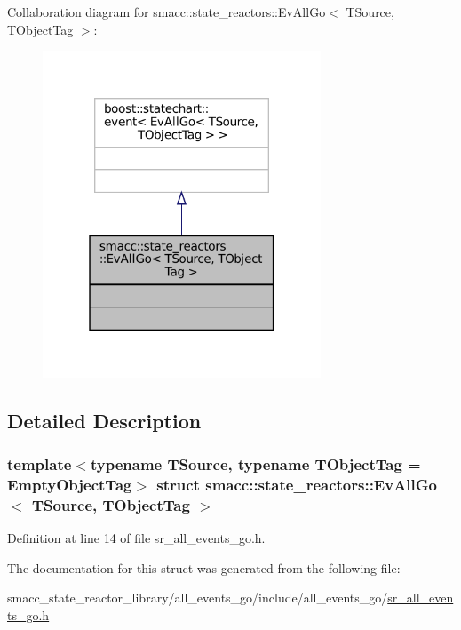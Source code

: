 Collaboration diagram for smacc\+:\+:state\+\_\+reactors\+:\+:Ev\+All\+Go$<$ T\+Source, T\+Object\+Tag $>$\+:
\nopagebreak
\begin{figure}[H]
\begin{center}
\leavevmode
\includegraphics[width=235pt]{structsmacc_1_1state__reactors_1_1EvAllGo__coll__graph}
\end{center}
\end{figure}


\subsection{Detailed Description}
\subsubsection*{template$<$typename T\+Source, typename T\+Object\+Tag = Empty\+Object\+Tag$>$\newline
struct smacc\+::state\+\_\+reactors\+::\+Ev\+All\+Go$<$ T\+Source, T\+Object\+Tag $>$}



Definition at line 14 of file sr\+\_\+all\+\_\+events\+\_\+go.\+h.



The documentation for this struct was generated from the following file\+:\begin{DoxyCompactItemize}
\item 
smacc\+\_\+state\+\_\+reactor\+\_\+library/all\+\_\+events\+\_\+go/include/all\+\_\+events\+\_\+go/\hyperlink{sr__all__events__go_8h}{sr\+\_\+all\+\_\+events\+\_\+go.\+h}\end{DoxyCompactItemize}

